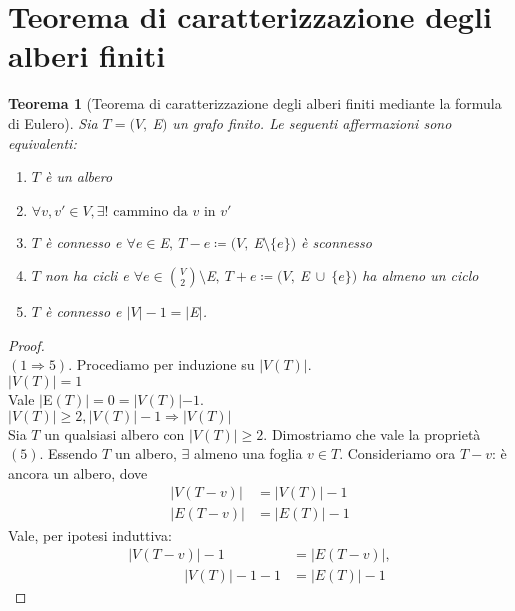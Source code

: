 \documentclass[12pt]{article}
\newcommand{\implica}{\Longrightarrow}
\renewcommand\qedsymbol{$\blacksquare$}
\newcommand{\Eps}{$E\:$}
\newcommand{\MathEps}{E}
\newcommand{\grafo}{(V, \: \Eps)}
\newcommand{\baseinduzalbero}[1]{\\[1\baselineskip]{\boldmath$ |V(T)| = #1$}}
\newcommand{\induzalbero}[1]{\\[1\baselineskip]{\boldmath$|V(T)| \ge #1, |V(T)| -1 \implica |V(T)|$}}
\newtheorem{theorem}{Teorema}
\begin{document}
\section{Teorema di caratterizzazione degli alberi finiti}
\begin{theorem}[Teorema di caratterizzazione degli alberi finiti mediante la formula di Eulero]
	Sia $T = \grafo$ un grafo finito. Le seguenti affermazioni sono equivalenti:
	\begin{enumerate}
		\item $T$ è un albero
		\item $\forall v, v' \in V, \exists! \text{ cammino da } v \text{ in } v'$
		\item $T$ è connesso e $\forall e \in \Eps,\ T-e \coloneqq (V,\ \Eps \setminus \{e\})$ è sconnesso
		\item $T$ non ha cicli e $\forall e \in \binom{V}{2} \setminus \Eps, \ T + e \coloneqq (V, \ \Eps \ \cup \ \{e\})$ ha almeno un ciclo
		\item $T$ è connesso e $|V| - 1 = |\Eps|$.
	\end{enumerate}
\end{theorem}

\renewcommand\qedsymbol{$\square$}
\begin{proof}\ \\
	$(1 \implica 5).$ Procediamo per induzione su $|V(T)|$.
	\baseinduzalbero{1}
	\\Vale $|\Eps(T)| = 0 = |V(T)| - 1$.
	\induzalbero{2}\nopagebreak
	\\Sia $T$ un qualsiasi albero con $|V(T)| \ge 2$. Dimostriamo che vale la proprietà $(5)$. Essendo $T$ un albero, $\exists$ almeno una foglia $v \in T$. Consideriamo ora $T - v$: è ancora un albero, dove
	\begin{align*}
		|V(T-v)|           & = |V(T)| - 1         \\
		| \MathEps (T-v) | & = |\MathEps (T) | -1
	\end{align*}
	Vale, per ipotesi induttiva:
	\begin{align*}
		|V(T-v) | -1 & = |\MathEps(T-v)|,
		\\ \qquad\qquad |V(T)| -1 -1 &= |\MathEps(T) | -1
	\end{align*}
\end{proof}
\end{document}
